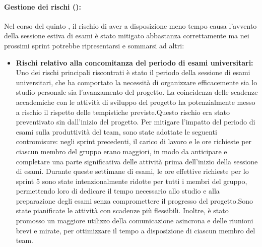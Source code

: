 \paragraph*{Gestione dei rischi ():}
\par Nel corso del quinto , il rischio di aver a disposizione meno tempo causa l'avvento della sessione estiva di esami è stato mitigato abbastanza correttamente ma nei prossimi sprint potrebbe ripresentarsi e sommarsi ad altri:
\begin{itemize}
  \item \textbf{Rischi relativo alla concomitanza del periodo di esami universitari:} Uno dei rischi principali riscontrati è stato il periodo della sessione di esami universitari, che ha comportato la necessità di organizzare efficacemente sia lo studio personale sia l'avanzamento del progetto. La coincidenza delle scadenze accademiche con le attività di sviluppo del progetto ha potenzialmente messo a rischio il rispetto delle tempistiche previste.Questo rischio era stato preventivato sin dall'inizio del progetto. Per mitigare l'impatto del periodo di esami sulla produttività del team, sono state adottate le seguenti contromisure: negli sprint precedenti, il carico di lavoro e le ore richieste per ciascun membro del gruppo erano maggiori, in modo da anticipare e completare una parte significativa delle attività prima dell'inizio della sessione di esami. Durante queste settimane di esami, le ore effettive richieste per lo sprint 5 sono state intenzionalmente ridotte per tutti i membri del gruppo, permettendo loro di dedicare il tempo necessario allo studio e alla preparazione degli esami senza compromettere il progresso del progetto.Sono state pianificate le attività con scadenze più flessibili. Inoltre, è stato promosso un maggiore utilizzo della comunicazione asincrona e delle riunioni brevi e mirate, per ottimizzare il tempo a disposizione di ciascun membro del team.
\end{itemize}